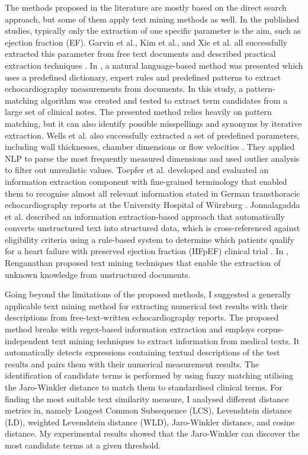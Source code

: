 The methods proposed in the literature are mostly based on the direct search approach, but some of them apply text mining methods as well. In the published studies, typically only the extraction of one specific parameter is the aim, such as ejection fraction (EF). Garvin et al., Kim et al., and Xie et al. all successfully extracted this parameter from free text documents and described practical extraction techniques \cite{xie2017extracting, garvin2012automated, kim2017extraction}. In \cite{patterson2017unlocking}, a natural language-based method was presented which uses a predefined dictionary, expert rules and predefined patterns to extract echocardiography measurements from documents. In this study, a pattern-matching algorithm was created and tested to extract term candidates from a large set of clinical notes. The presented method relies heavily on pattern matching, but it can also identify possible misspellings and synonyms by iterative extraction. Wells et al. also successfully extracted a set of predefined parameters, including wall thicknesses, chamber dimensions or flow velocities \cite{wells2014extraction}. They applied NLP to parse the most frequently measured dimensions and used outlier analysis to filter out unrealistic values. Toepfer et al. developed and evaluated an information extraction component with fine-grained terminology that enabled them to recognise almost all relevant information stated in German transthoracic echocardiography reports at the University Hospital of Würzburg \cite{toepfer2015fine}. Jonnalagadda et al. described an information extraction-based approach that automatically converts unstructured text into structured data, which is cross-referenced against eligibility criteria using a rule-based system to determine which patients qualify for a heart failure with preserved ejection fraction (HFpEF) clinical trial \cite{jonnalagadda2017text}. In \cite{renganathan2017text}, Renganathan proposed text mining techniques that enable the extraction of unknown knowledge from unstructured documents.

Going beyond the limitations of the proposed methods, I suggested a generally applicable text mining method \cite{szeker2023general} for extracting numerical test results with their descriptions from free-text-written echocardiography reports. The proposed method breaks with regex-based information extraction and employs corpus-independent text mining techniques to extract information from medical texts. It automatically detects expressions containing textual descriptions of the test results and pairs them with their numerical measurement results. The identification of candidate terms is performed by using fuzzy matching utilising the Jaro-Winkler distance to match them to standardised clinical terms. For finding the most suitable text similarity measure, I analysed different distance metrics in, namely Longest Common Subsequence (LCS), Levenshtein distance (LD), weighted Levenshtein distance (WLD), Jaro-Winkler distance, and cosine distance. My experimental results showed that the Jaro-Winkler can discover the most candidate terms at a given threshold.


